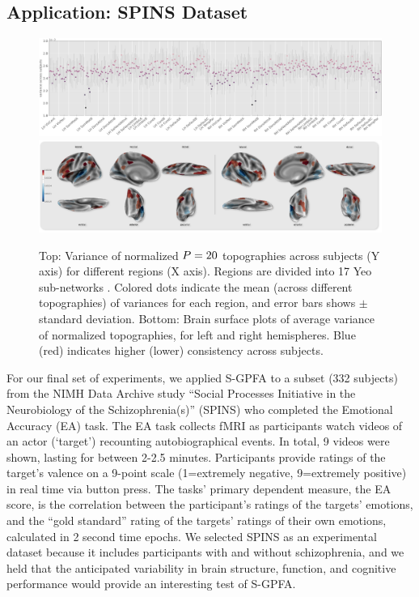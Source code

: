 \subsection{Application: SPINS Dataset}

\begin{figure}[!t]
    \centering
    \includegraphics[width=1\linewidth]{figures/ch1/topo_cons_scatter.png}
    \includegraphics[width=1\linewidth]{figures/ch1/topo1_brain.pdf}
    \caption{Top: Variance of normalized $P=20$ topographies across subjects (Y axis) for different regions (X axis). Regions are divided into 17 Yeo sub-networks \cite{yeo}. Colored dots indicate the mean (across different topographies) of variances for each region, and error bars shows $\pm$ standard deviation. Bottom: Brain surface plots of average variance of normalized topographies, for left and right hemispheres. Blue (red) indicates higher (lower) consistency across subjects. 
    }
    \label{fig:topo}
\end{figure}

For our final set of experiments, we applied S-GPFA to a subset (332 subjects) from the NIMH Data Archive study “Social Processes Initiative in the Neurobiology of the Schizophrenia(s)” (SPINS) who completed the Emotional Accuracy (EA) task. The EA task collects fMRI as participants watch videos of an actor (‘target’) recounting autobiographical events. In total, 9 videos were shown, lasting for between 2-2.5 minutes. Participants provide ratings of the target’s valence on a 9-point scale (1=extremely negative, 9=extremely positive) in real time via button press. The tasks' primary dependent measure, the EA score, is the correlation between the participant’s ratings of the targets’ emotions, and the “gold standard” rating of the targets’ ratings of their own emotions, calculated in 2 second time epochs. We selected SPINS as an experimental dataset because it includes participants with and without schizophrenia, and we held that the anticipated variability in brain structure, function, and cognitive performance would provide an interesting test of S-GPFA.

